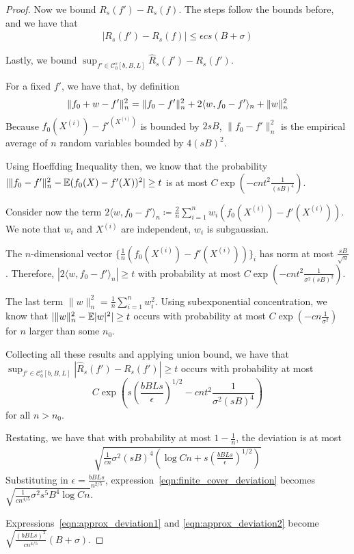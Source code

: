 \begin{proof}
Now we bound $R_s(f') - R_s(f)$. The steps follow the bounds before, and we have that 
\begin{align}
|R_s(f') - R_s(f)| \leq \epsilon cs(B + \sigma) \label{eqn:approx_deviation2}
\end{align}

Lastly, we bound $\sup_{f' \in \mathcal{C}_0^s[b,B,L]} \hat{R}_s(f') - R_s(f')$. 

For a fixed $f'$, we have that, by definition
\[
\| f_0 + w - f' \|_n^2 = \| f_0 - f'\|_n^2 + 2 \langle w, f_0 - f'\rangle_n + \| w \|_n^2 \\
\]
Because $f_0(X^{(i)}) - f'^(X^{(i)})$ is bounded by $2sB$, $\| f_0 - f'\|_n^2$ is the empirical average of $n$ random variables bounded by $4(sB)^2$. 

Using Hoeffding Inequality then, we know that the probability $| \| f_0 - f' \|_n^2 - {\mathbb E}(f_0(X) - f '(X))^2 | \geq t $ is at most $C \exp( - c n t^2 \frac{1}{(sB)^4})$. 

Consider now the term $2 \langle w, f_0 - f' \rangle_n \coloneqq \frac{2}{n} \sum_{i=1}^n w_i ( f_0(X^{(i)}) - f'(X^{(i)}))$. We note that $w_i$ and $X^{(i)}$ are independent, $w_i$ is subgaussian. 

The $n$-dimensional vector $\{ \frac{1}{n} ( f_0(X^{(i)}) - f'(X^{(i)})) \}_i$ has norm at most $\frac{sB}{\sqrt{n}}$. Therefore, $|2 \langle w, f_0 - f' \rangle_n | \geq t$ with probability at most $C \exp( - c n t^2 \frac{1}{\sigma^2(sB)^2})$. 

The last term $\| w \|_n^2 = \frac{1}{n} \sum_{i=1}^n w_i^2$. Using subexponential concentration, we know that $ |\| w \|_n^2 - {\mathbb E}|w|^2 | \geq t$ occurs with probability at most $C \exp( - c n \frac{1}{\sigma^2} )$ for $n$ larger than some $n_0$.

Collecting all these results and applying union bound, we have that $\sup_{f' \in \mathcal{C}_0^s[b,B,L]} | \hat{R}_s(f') - R_s(f') | \geq t$ occurs with probability at most
\[
C \exp( s\left( \frac{bBLs}{\epsilon} \right)^{1/2} - c n t^2 \frac{1}{\sigma^2 (sB)^4} )
\]
for all $n > n_0$.

Restating, we have that with probability at most $1- \frac{1}{n}$, the deviation is at most 
\begin{align}
\sqrt{ \frac{1}{cn} \sigma^2 (sB)^4 \left( \log Cn + s( \frac{bBLs}{\epsilon})^{1/2} \right)} \label{eqn:finite_cover_deviation}
\end{align}
Substituting in $\epsilon = \frac{bBLs}{n^{2/5}}$, expression~\ref{eqn:finite_cover_deviation} becomes $\sqrt{ \frac{1}{cn^{4/5}} \sigma^2 s^5 B^4 \log Cn}$.

Expressions~\ref{eqn:approx_deviation1} and \ref{eqn:approx_deviation2} become $\sqrt{ \frac{(bBLs)^2}{cn^{4/5}}} (B+\sigma)$.

\end{proof}
 
